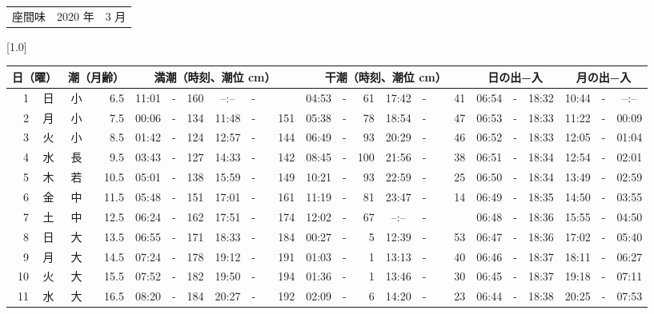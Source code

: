 \documentclass[12pt,a4j]{jsarticle}
\begin{document}
 \begin{table}[htbp]
 \begin{center}
 \begin{tabular}{lcc}
 \LARGE{座間味}  & \large{2020 年} & \large{ 3 月} \\
 \end{tabular}
 \end{center}
 \begin{center}
    \scalebox{0.7}[1.0]{
    \begin{tabular}{|rc|cr|ccrccr|ccrccr|ccc|ccc|}
    \hline
    \multicolumn{2}{|c|}{日（曜）} & \multicolumn{2}{c|}{潮（月齢）} & \multicolumn{6}{c|}{満潮（時刻、潮位 cm）} & \multicolumn{6}{c|}{干潮（時刻、潮位 cm）} & \multicolumn{3}{c|}{日の出−入} &  \multicolumn{3}{c|}{月の出−入}\\
 \hline
 1 & 日 & 小 &  6.5 &  11:01 &-& 160 &  --:-- &-&~~~~~ &  04:53 &-&  61 &  17:42 &-&  41 & 06:54 & -& 18:32 & 10:44 & -& --:-- \\
 2 & 月 & 小 &  7.5 &  00:06 &-& 134 &  11:48 &-& 151 &  05:38 &-&  78 &  18:54 &-&  47 & 06:53 & -& 18:33 & 11:22 & -& 00:09 \\
 3 & 火 & 小 &  8.5 &  01:42 &-& 124 &  12:57 &-& 144 &  06:49 &-&  93 &  20:29 &-&  46 & 06:52 & -& 18:33 & 12:05 & -& 01:04 \\
 4 & 水 & 長 &  9.5 &  03:43 &-& 127 &  14:33 &-& 142 &  08:45 &-& 100 &  21:56 &-&  38 & 06:51 & -& 18:34 & 12:54 & -& 02:01 \\
 5 & 木 & 若 & 10.5 &  05:01 &-& 138 &  15:59 &-& 149 &  10:21 &-&  93 &  22:59 &-&  25 & 06:50 & -& 18:34 & 13:49 & -& 02:59 \\
 6 & 金 & 中 & 11.5 &  05:48 &-& 151 &  17:01 &-& 161 &  11:19 &-&  81 &  23:47 &-&  14 & 06:49 & -& 18:35 & 14:50 & -& 03:55 \\
 7 & 土 & 中 & 12.5 &  06:24 &-& 162 &  17:51 &-& 174 &  12:02 &-&  67 &  --:-- &-&~~~~~ & 06:48 & -& 18:36 & 15:55 & -& 04:50 \\
 8 & 日 & 大 & 13.5 &  06:55 &-& 171 &  18:33 &-& 184 &  00:27 &-&   5 &  12:39 &-&  53 & 06:47 & -& 18:36 & 17:02 & -& 05:40 \\
 9 & 月 & 大 & 14.5 &  07:24 &-& 178 &  19:12 &-& 191 &  01:03 &-&   1 &  13:13 &-&  40 & 06:46 & -& 18:37 & 18:11 & -& 06:27 \\
10 & 火 & 大 & 15.5 &  07:52 &-& 182 &  19:50 &-& 194 &  01:36 &-&   1 &  13:46 &-&  30 & 06:45 & -& 18:37 & 19:18 & -& 07:11 \\
11 & 水 & 大 & 16.5 &  08:20 &-& 184 &  20:27 &-& 192 &  02:09 &-&   6 &  14:20 &-&  23 & 06:44 & -& 18:38 & 20:25 & -& 07:53 \\

\end{tabular}}
\end{center}
\end{table}
\end{document}
